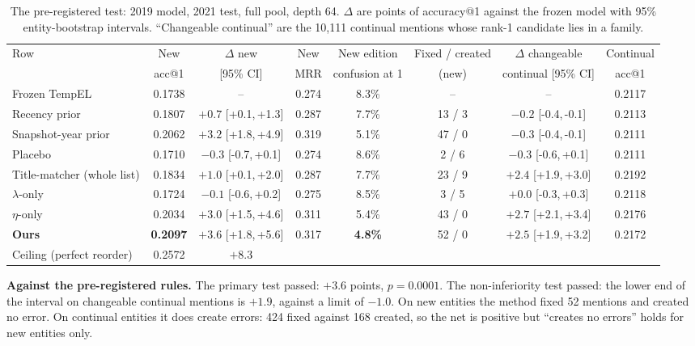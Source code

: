 \documentclass[conference]{IEEEtran}
\newcommand{\ci}[2]{[#1,\,#2]}
\begin{document}
\begin{table}[t]
\caption{The pre-registered test: 2019 model, 2021 test, full pool, depth 64. $\Delta$ are points of accuracy@1 against the frozen model with 95\% entity-bootstrap intervals. ``Changeable continual'' are the 10,111 continual mentions whose rank-1 candidate lies in a family.}
\label{tab:main}
\centering
\footnotesize
\begin{tabular}{lccccccc}
\toprule
Row & New & $\Delta$ new & New & New edition & Fixed / created & $\Delta$ changeable & Continual \\
 & acc@1 & [95\% CI] & MRR & confusion at 1 & (new) & continual [95\% CI] & acc@1 \\
\midrule
Frozen TempEL & 0.1738 & -- & 0.274 & 8.3\% & -- & -- & 0.2117 \\
Recency prior & 0.1807 & $+0.7$ \ci{+0.1}{+1.3} & 0.287 & 7.7\% & 13 / 3 & $-0.2$ \ci{-0.4}{-0.1} & 0.2113 \\
Snapshot-year prior & 0.2062 & $+3.2$ \ci{+1.8}{+4.9} & 0.319 & 5.1\% & 47 / 0 & $-0.3$ \ci{-0.4}{-0.1} & 0.2111 \\
Placebo & 0.1710 & $-0.3$ \ci{-0.7}{+0.1} & 0.274 & 8.6\% & 2 / 6 & $-0.3$ \ci{-0.6}{+0.1} & 0.2111 \\
Title-matcher (whole list) & 0.1834 & $+1.0$ \ci{+0.1}{+2.0} & 0.287 & 7.7\% & 23 / 9 & $+2.4$ \ci{+1.9}{+3.0} & 0.2192 \\
$\lambda$-only & 0.1724 & $-0.1$ \ci{-0.6}{+0.2} & 0.275 & 8.5\% & 3 / 5 & $+0.0$ \ci{-0.3}{+0.3} & 0.2118 \\
$\eta$-only & 0.2034 & $+3.0$ \ci{+1.5}{+4.6} & 0.311 & 5.4\% & 43 / 0 & $+2.7$ \ci{+2.1}{+3.4} & 0.2176 \\
\textbf{Ours} & \textbf{0.2097} & $\mathbf{+3.6}$ \ci{+1.8}{+5.6} & 0.317 & \textbf{4.8\%} & 52 / 0 & $+2.5$ \ci{+1.9}{+3.2} & 0.2172 \\
\midrule
Ceiling (perfect reorder) & 0.2572 & $+8.3$ & & & & & \\
\bottomrule
\end{tabular}
\end{table}

\textbf{Against the pre-registered rules.}
The primary test passed: $+3.6$ points, $p = 0.0001$. The non-inferiority test passed: the lower end
of the interval on changeable continual mentions is $+1.9$, against a limit of $-1.0$. On new
entities the method fixed 52 mentions and created no error. On continual entities it does create
errors: 424 fixed against 168 created, so the net is positive but ``creates no errors'' holds for new
entities only.
\end{document}
